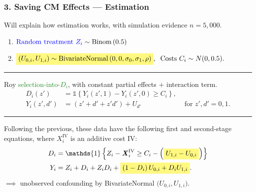 \documentclass[dvipsnames]{beamer} %
\renewcommand{\vec}[1]{\boldsymbol{\mathit{#1}}}                           %
\newcommand{\indicator}[1]{\mathds{1}\left\{ #1 \right\}}                  %
\newcommand{\eqhighlight}[2]{\colorbox{#1!50}{$\displaystyle#2$}}
\begin{document}
\begin{frame}
    \frametitle{3. Saving CM Effects --- Estimation}
    Will explain how estimation works, with simulation evidence $n = 5,000$.
    \vskip0cm
    \begin{enumerate}
        \item $\text{\textcolor{blue}{Random treatment $Z_i$}}
            \sim \text{Binom}\left(0.5 \right) $
        \item $ \eqhighlight{yellow}{
            \left( U_{0,i}, U_{1,i} \right) \sim
        \text{BivariateNormal}\left( 0, 0, \sigma_0, \sigma_1, \rho \right)},
            \;\; \text{Costs }C_i \sim N(0, 0.5). $
    \end{enumerate}
    \par\noindent\rule{\textwidth}{0.4pt}
    Roy \textcolor{ForestGreen}{selection-into-$D_i$}, with constant partial effects $+$ interaction term.
    \begin{align*}
        D_i(z')    &= \indicator{Y_i(z', 1) - Y_i(z', 0) \geq C_i},&  \\
        Y_i(z',d') &= \left( z' + d' + z' d' \right) + U_{d'}
        & \text{ for } z',d' = 0,1.
    \end{align*}
    \par\noindent\rule{\textwidth}{0.4pt}
    Following the previous, these data have the following first and second-stage equations, where $\vec X_i^\text{IV}$ is an additive cost IV:
    \begin{align*}
        D_i &= \indicator{Z_i - \vec X_i^{\text{IV}}
            \geq C_i - \Big(\eqhighlight{yellow}{U_{1,i} - U_{0,i}} \Big) } \\
        Y_i &= Z_i + D_i + Z_i D_i
            + \eqhighlight{yellow}{
                \left( 1 - D_i \right) U_{0,i} + D_i U_{1,i}}.
    \end{align*}
    \small
    $\implies$ unobserved confounding by BivariateNormal $\Big(U_{0,i}, U_{1,i}\Big)$.
\end{frame}
\end{document}
